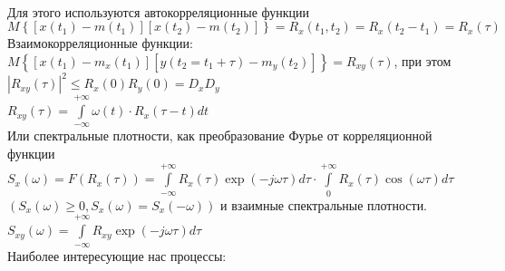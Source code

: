 \documentclass[preprint,russian,a5paper,10pt,twoside,mediummath]{ncc}
\begin{document}
\\Для этого используются автокорреляционные функции 
\\$M\left\{ \left[ x\left( {{t}_{1}} \right)-m\left( {{t}_{1}} \right) \right]\left[ x\left( {{t}_{2}} \right)-m\left( {{t}_{2}} \right) \right] \right\}={{R}_{x}}\left( {{t}_{1}},{{t}_{2}} \right)={{R}_{x}}\left( {{t}_{2}}-{{t}_{1}} \right)={{R}_{x}}\left( \tau  \right)$ 
\\Взаимокорреляционные функции:
\\$M\left\{ \left[ x\left( {{t}_{1}} \right)-{{m}_{x}}\left( {{t}_{1}} \right) \right]\left[ y\left( {{t}_{2}}={{t}_{1}}+\tau  \right)-{{m}_{y}}\left( {{t}_{2}} \right) \right] \right\}={{R}_{xy}}\left( \tau  \right)$, при этом ${{\left| {{R}_{xy}}\left( \tau  \right) \right|}^{2}}\le {{R}_{x}}\left( 0 \right){{R}_{y}}\left( 0 \right)={{D}_{x}}{{D}_{y}}$
\\${{R}_{xy}}\left( \tau  \right)=\int\limits_{-\infty }^{+\infty }{\omega \left( t \right)}\cdot {{R}_{x}}\left( \tau -t \right)dt$
\\Или спектральные плотности, как преобразование Фурье от корреляционной функции ${{S}_{x}}\left( \omega  \right)=F\left( {{R}_{x}}\left( \tau  \right) \right)=\int\limits_{-\infty }^{+\infty }{{{R}_{x}}}\left( \tau  \right)\exp \left( -j\omega \tau  \right)d\tau \cdot \int\limits_{0}^{+\infty }{{{R}_{x}}}\left( \tau  \right)\cos \left( \omega \tau  \right)d\tau $ $\left( {{S}_{x}}\left( \omega  \right)\ge 0,{{S}_{x}}\left( \omega  \right)={{S}_{x}}\left( -\omega  \right) \right)$ и взаимные спектральные плотности. 
\\${{S}_{xy}}\left( \omega  \right)=\int\limits_{-\infty }^{+\infty }{{{R}_{xy}}\exp \left( -j\omega \tau  \right)}d\tau $
\\Наиболее интересующие нас процессы:
\end{document}
